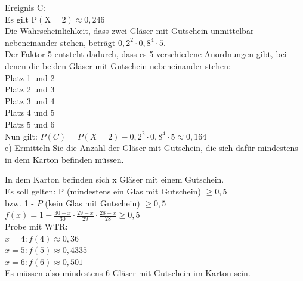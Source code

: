 \documentclass[10pt]{article}
\begin{document}
Ereignis C:\\
Es gilt $\mathrm{P}(\mathrm{X}=2) \approx 0,246$\\
Die Wahrscheinlichkeit, dass zwei Gläser mit Gutschein unmittelbar nebeneinander stehen, beträgt $0,2^{2} \cdot 0,8^{4} \cdot 5$.\\
Der Faktor 5 entsteht dadurch, dass es 5 verschiedene Anordnungen gibt, bei denen die beiden Gläser mit Gutschein nebeneinander stehen:\\
Platz 1 und 2\\
Platz 2 und 3\\
Platz 3 und 4\\
Platz 4 und 5\\
Platz 5 und 6\\
Nun gilt: $P(C)=P(X=2)-0,2^{2} \cdot 0,8^{4} \cdot 5 \approx 0,164$\\
e) Ermitteln Sie die Anzahl der Gläser mit Gutschein, die sich dafür mindestens in dem Karton befinden müssen.

In dem Karton befinden sich x Gläser mit einem Gutschein.\\
Es soll gelten: P (mindestens ein Glas mit Gutschein) $\geq 0,5$\\
bzw. 1 - $P$ (kein Glas mit Gutschein) $\geq 0,5$\\
$f(x)=1-\frac{30-x}{30} \cdot \frac{29-x}{29} \cdot \frac{28-x}{28} \geq 0,5$\\
Probe mit WTR:\\
$x=4: f(4) \approx 0,36$\\
$x=5: f(5) \approx 0,4335$\\
$x=6: f(6) \approx 0,501$\\
Es müssen also mindestens 6 Gläser mit Gutschein im Karton sein.
\end{document}
